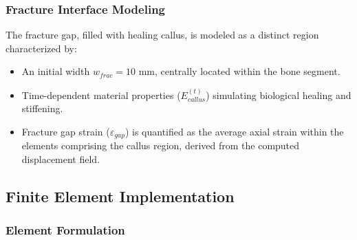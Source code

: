 \documentclass{article}
\begin{document}
\subsubsection{Fracture Interface Modeling}
The fracture gap, filled with healing callus, is modeled as a distinct region characterized by:
\begin{itemize}
  \item An initial width $w_{frac} = 10$ mm, centrally located within the bone segment.
  \item Time-dependent material properties ($E_{callus}^{(t)}$) simulating biological healing and stiffening.
  \item Fracture gap strain ($\varepsilon_{gap}$) is quantified as the average axial strain within the elements comprising the callus region, derived from the computed displacement field.
\end{itemize}

\subsection{Finite Element Implementation}

\subsubsection{Element Formulation}
\end{document}
